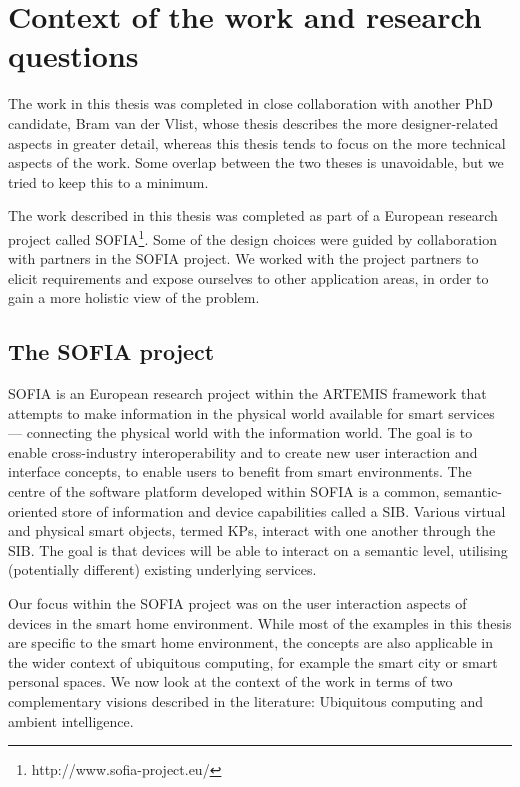 \section{Context of the work and research questions}

The work in this thesis was completed in close collaboration with another PhD candidate, Bram van der Vlist, whose thesis \cite{Bram} describes the more designer-related aspects in greater detail, whereas this thesis tends to focus on the more technical aspects of the work. Some overlap between the two theses is unavoidable, but we tried to keep this to a minimum. 

The work described in this thesis was completed as part of a European research project called \ac{SOFIA}\footnote{http://www.sofia-project.eu/}. Some of the design choices were guided by collaboration with partners in the \ac{SOFIA} project. We worked with the project partners to elicit requirements and expose ourselves to other application areas, in order to gain a more holistic view of the problem.


\subsection{The SOFIA project}\label{sofia}

\ac{SOFIA} is an European research project within the ARTEMIS framework that attempts to make information in the physical world available for smart services --- connecting the physical world with the information world. The goal is to enable cross-industry interoperability and to create new user interaction and interface concepts, to enable users to benefit from smart environments. The centre of the software platform developed within \ac{SOFIA} is a common, semantic-oriented store of information and device capabilities called a \ac{SIB}. Various virtual and physical smart objects, termed \acp{KP}, interact with one another through the \ac{SIB}. The goal is that devices will be able to interact on a semantic level, utilising (potentially different) existing underlying services.

Our focus within the \ac{SOFIA} project was on the user interaction aspects of devices in the smart home environment. While most of the examples in this thesis are specific to the smart home environment, the concepts are also applicable in the wider context of ubiquitous computing, for example the smart city or smart personal spaces. We now look at the context of the work in terms of two complementary visions described in the literature: Ubiquitous computing and ambient intelligence.


